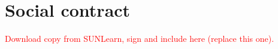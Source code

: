 \chapter{Social contract}
\makeatletter{}\makeatother
\label{appen:social_contract}
\textcolor{red}{Download copy from SUNLearn, sign and include here (replace this one).}
     \begin{figure}[!htb]
     \centering
       \label{fig:social_contract}
	\end{figure}